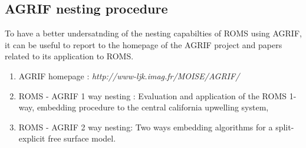 \subsection{AGRIF nesting procedure}
\label{sec:2-ways-nesting}
To have a better undersatnding of the nesting capabilties of ROMS using AGRIF, it can
be useful to report to the homepage of the AGRIF project and  papers related to its
application to ROMS.
\begin{enumerate}
\item  AGRIF homepage : \textit{http://www-ljk.imag.fr/MOISE/AGRIF/}
\item  ROMS - AGRIF 1 way nesting : Evaluation and application of the ROMS 1-way, 
embedding procedure to the central california upwelling system, \citep{Pen04}
\item ROMS - AGRIF 2 way nesting: Two ways embedding algorithms for a split-explicit
  free surface model. \citep{DebreuMarchesiello2010}
\end{enumerate}


